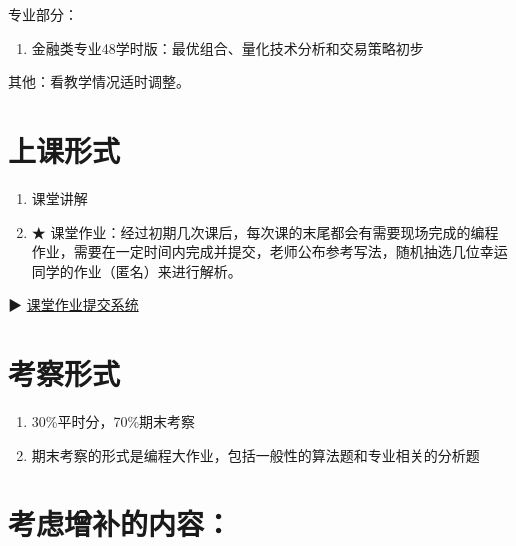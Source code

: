 \documentclass[
  letterpaper,
  DIV=11,
  numbers=noendperiod]{scrreprt}
\providecommand{\tightlist}{%
  \setlength{\itemsep}{0pt}\setlength{\parskip}{0pt}}\usepackage{longtable,booktabs,array}
\begin{document}
专业部分：

\begin{enumerate}
\def\labelenumi{\arabic{enumi}.}
\tightlist
\item
  金融类专业48学时版：最优组合、量化技术分析和交易策略初步
\end{enumerate}

其他：看教学情况适时调整。

\hypertarget{ux4e0aux8bfeux5f62ux5f0f}{%
\section*{上课形式}\label{ux4e0aux8bfeux5f62ux5f0f}}


\begin{enumerate}
\def\labelenumi{\arabic{enumi}.}
\tightlist
\item
  课堂讲解
\item
  ★
  课堂作业：经过初期几次课后，每次课的末尾都会有需要现场完成的编程作业，需要在一定时间内完成并提交，老师公布参考写法，随机抽选几位幸运同学的作业（匿名）来进行解析。
\end{enumerate}

▶ \href{https://py4ss.net/aasp}{课堂作业提交系统}

\hypertarget{ux8003ux5bdfux5f62ux5f0f}{%
\section*{考察形式}\label{ux8003ux5bdfux5f62ux5f0f}}


\begin{enumerate}
\def\labelenumi{\arabic{enumi}.}
\tightlist
\item
  30\%平时分，70\%期末考察
\item
  期末考察的形式是编程大作业，包括一般性的算法题和专业相关的分析题
\end{enumerate}

\hypertarget{ux8003ux8651ux589eux8865ux7684ux5185ux5bb9}{%
\section*{考虑增补的内容：}\label{ux8003ux8651ux589eux8865ux7684ux5185ux5bb9}}

\end{document}

